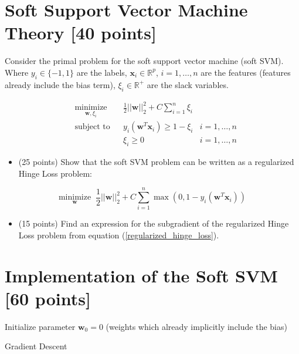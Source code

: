 \section{Soft Support Vector Machine Theory [40 points]}
\label{prb:hw2::prob1}

Consider the primal problem for the soft support vector machine (soft SVM).  Where $y_i \in \{-1,1\}$ are the labels, $\mathbf{x}_i \in \mathbb{R}^p$, $i=1,\ldots,n$ are the features (features already include the bias term), $\xi_{i} \in \mathbb{R}^{+}$ are the slack variables.

\begin{equation}
\label{soft_svm}
\begin{aligned}
& \underset{\mathbf{w}, \xi_i}{\text{minimize}} && \frac{1}{2}||\mathbf{w}||_2^2 + C\sum_{i=1}^n\xi_i\\
& \text{subject to} && y_i(\mathbf{w}^T\mathbf{x}_i) \geq 1-\xi_i & i = 1,\ldots, n\\
& && \xi_i \geq 0 & i = 1,\ldots, n
\end{aligned}
\end{equation}

\begin{itemize}[(a)]
    \item (25 points) Show that the soft SVM problem can be written as a regularized Hinge Loss problem:
\end{itemize}
\begin{equation}
\label{regularized_hinge_loss}
\underset{\mathbf{w}}{\text{minimize}} \;\; \frac{1}{2}||\mathbf{w}||_2^2 + C \sum_{i=1}^n \max\left(0, 1 - y_{i} (\mathbf{w}^T\mathbf{x}_i) \right)
\end{equation}

\begin{itemize}[(b)]
\label{subgradient}
    \item (15 points) Find an expression for the subgradient of the regularized Hinge Loss problem from equation (\ref{regularized_hinge_loss}).
\end{itemize}


\newpage
\section{Implementation of the Soft SVM [60 points]}
\label{prb:hw2::prob2}

\begin{algorithm}[H]
\SetAlgoLined
{}
Initialize parameter $\mathbf{w}_{0}=0$ (weights which already implicitly include the bias)

 \caption{Gradient Descent}
\end{algorithm}

